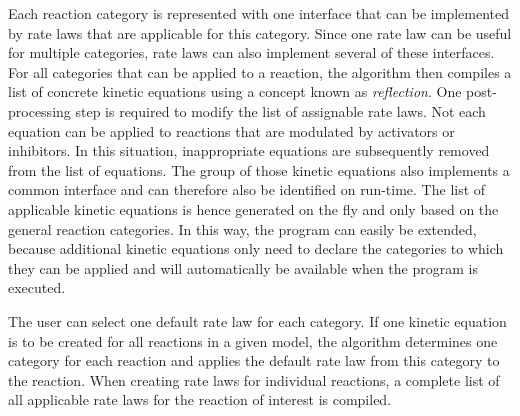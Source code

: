Each reaction category is represented with one interface that can be implemented by rate laws that are applicable for this category.
Since one rate law can be useful for multiple categories, rate laws can also implement several of these interfaces.
For all categories that can be applied to a reaction, the algorithm then compiles a list of concrete kinetic equations using a concept known as \emph{reflection}.
One post-processing step is required to modify the list of assignable rate laws.
Not each equation can be applied to reactions that are modulated by activators or inhibitors.
In this situation, inappropriate equations are subsequently removed from the list of equations.
The group of those kinetic equations also implements a common interface and can therefore also be identified on run-time.
The list of applicable kinetic equations is hence generated on the fly and only based on the general reaction categories.
In this way, the program can easily be extended, because additional kinetic equations only need to declare the categories to which they can be applied and will automatically be available when the program is executed.

The user can select one default rate law for each category.
If one kinetic equation is to be created for all reactions in a given model, the algorithm determines one category for each reaction and applies the default rate law from this category to the reaction.
When creating rate laws for individual reactions, a complete list of all applicable rate laws for the reaction of interest is compiled.

